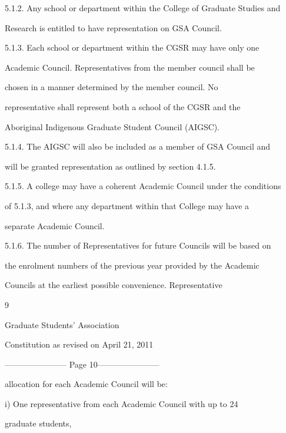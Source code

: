 \documentclass{article}
\begin{document}
5.1.2. Any school or department within the College of Graduate Studies and  

Research is entitled to have representation on GSA Council.  



5.1.3. Each  school  or  department  within  the  CGSR  may  have  only  one  

Academic Council. Representatives from the member council shall be  

chosen     in   a   manner      determined      by    the   member       council.    No  

representative  shall  represent  both  a  school  of  the  CGSR  and  the  

Aboriginal Indigenous Graduate Student Council (AIGSC).  



5.1.4. The AIGSC will also be included as a member of GSA Council and  

will be granted representation as outlined by section 4.1.5.  



5.1.5. A college may have a coherent Academic Council under the conditions  

of  5.1.3, and where any department within that College may have a  

separate  Academic Council.  



5.1.6. The  number  of  Representatives  for  future  Councils  will  be  based  on  

the enrolment numbers of the previous year provided by the Academic  

Councils      at   the    earliest    possible     convenience.       Representative  



      9  



       Graduate Students’ Association  



  Constitution as revised on April 21, 2011  


----------------------- Page 10-----------------------

allocation for each Academic Council will be:  



i)      One   representative  from   each  Academic   Council   with  up   to  24  

graduate students,  
\end{document}
